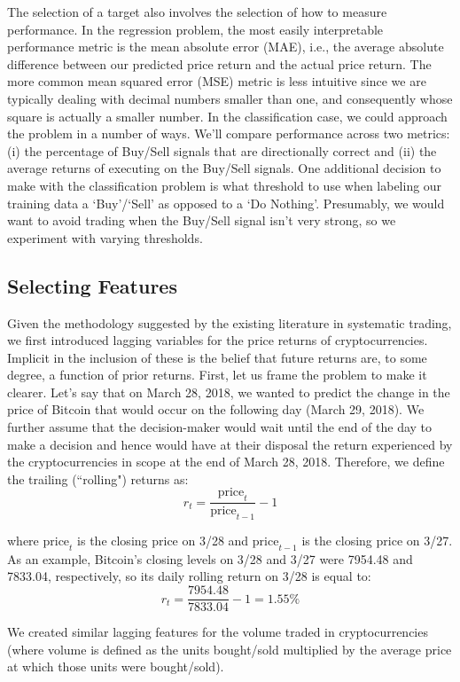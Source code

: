 \documentclass[12pt,twoside]{article}
\begin{document}
The selection of a target also involves the selection of how to measure performance. In the regression problem, the most easily interpretable performance metric is the mean absolute error (MAE), i.e., the average absolute difference between our predicted price return and the actual price return. The more common mean squared error (MSE) metric is less intuitive since we are typically dealing with decimal numbers smaller than one, and consequently whose square is actually a smaller number. In the classification case, we could approach the problem in a number of ways. We'll compare performance across two metrics: (i) the percentage of Buy/Sell signals that are directionally correct and (ii) the average returns of executing on the Buy/Sell signals. One additional decision to make with the classification problem is what threshold to use when labeling our training data a `Buy'/`Sell' as opposed to a `Do Nothing'. Presumably, we would want to avoid trading when the Buy/Sell signal isn't very strong, so we experiment with varying thresholds.

\subsection{Selecting Features}

Given the methodology suggested by the existing literature in systematic trading, we first introduced lagging variables for the price returns of cryptocurrencies. Implicit in the inclusion of these is the belief that future returns are, to some degree, a function of prior returns. First, let us frame the problem to make it clearer. Let's say that on March 28, 2018, we wanted to predict the change in the price of Bitcoin that would occur on the following day (March 29, 2018). We further assume that the decision-maker would wait until the end of the day to make a decision and hence would have at their disposal the return experienced by the cryptocurrencies in scope at the end of March 28, 2018. Therefore, we define the trailing (``rolling") returns as:
$$r_t = \frac{\text{price}_t}{\text{price}_{t-1}} - 1$$

where $\text{price}_t$ is the closing price on 3/28 and $\text{price}_{t-1}$ is the closing price on 3/27. As an example, Bitcoin's closing levels on 3/28 and 3/27 were 7954.48 and 7833.04, respectively, so its daily rolling return on 3/28 is equal to:
$$r_t = \frac{7954.48}{7833.04} - 1=1.55\%$$

We created similar lagging features for the volume traded in cryptocurrencies (where volume is defined as the units bought/sold multiplied by the average price at which those units were bought/sold).
\end{document}
